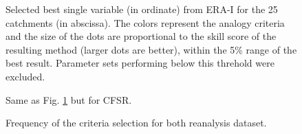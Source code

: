 \documentclass[draft]{agujournal2019}
\begin{document}
\begin{figure}[hbt]
	\noindent{}
	\caption{Selected best single variable (in ordinate) from ERA-I for the 25 catchments (in abscissa). The colors represent the analogy criteria and the size of the dots are proportional to the skill score of the resulting method (larger dots are better), within the 5\% range of the best result. Parameter sets performing below this threhold were excluded.}
	\label{fig_best_era_int}
\end{figure}

\begin{figure}[hbt]
	\noindent{}
	\caption{Same as Fig. \ref{fig_best_era_int} but for CFSR.}
	\label{fig_best_cfsr}
\end{figure}

\begin{figure}[hbt]
	\noindent{}
	\caption{Frequency of the criteria selection for both reanalysis dataset.}
	\label{fig_criteria}
\end{figure}
\end{document}
